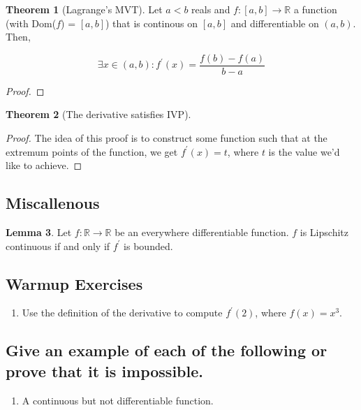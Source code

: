 \documentclass{article}
\theoremstyle{definition}
\newtheorem{theorem}{Theorem}[section]
\newtheorem{lemma}[theorem]{Lemma}
\newcommand{\R}{\mathbb{R}}
\begin{document}
\begin{theorem}[Lagrange's MVT]\label{lagrange_mvt}
    Let $a < b$ reals and $f: [a,b] \xrightarrow{} \R$ a function (with Dom($f$) = $[a,b]$)
    that is continous on $[a,b]$ and differentiable on $(a,b)$. Then,

    \[ \exists x \in (a,b): f^{\prime}(x) = \frac{f(b) - f(a)}{b-a}\]
\end{theorem}
\begin{proof}
    
\end{proof}

\begin{theorem}[The derivative satisfies IVP]
    
\end{theorem}
\begin{proof}
    The idea of this proof is to construct some function such that
    at the extremum points of the function, we get $f^{\prime}(x) = t$,
    where $t$ is the value we'd like to achieve.
\end{proof}

\subsection{Miscallenous}

\begin{lemma}
    Let $f: \R \xrightarrow{} \R$ be an everywhere differentiable function.
    $f$ is Lipschitz continuous if and only if $f^{\prime}$ is bounded.
\end{lemma}

\subsection{Warmup Exercises}

\begin{enumerate}
    \item Use the definition of the derivative to compute $f^{\prime}(2)$, where $f(x)= x^{3}$.
\end{enumerate}

\subsection{Give an example of each of the following or prove that it is impossible.}

\begin{enumerate}
    \item A continuous but not differentiable function.
\end{enumerate}
\end{document}
